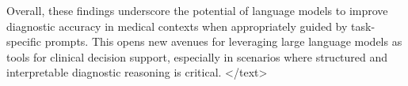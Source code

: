 \documentclass{article}
\begin{document}
Overall, these findings underscore the potential of language models to improve diagnostic accuracy in medical contexts when appropriately guided by task-specific prompts. This opens new avenues for leveraging large language models as tools for clinical decision support, especially in scenarios where structured and interpretable diagnostic reasoning is critical.
</text>
\end{document}
